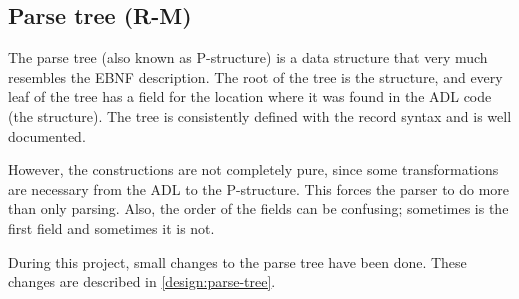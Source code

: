 
\subsection{Parse tree (R-M)}
\label{analysis:parse-tree}
The parse tree (also known as P-structure) is a data structure that very much resembles the EBNF description.
The root of the tree is the  structure, and every leaf of the tree has a field for the location where it was found in the ADL code (the  structure).
The tree is consistently defined with the record syntax and is well documented.

However, the constructions are not completely pure, since some transformations are necessary from the ADL to the P-structure.
This forces the parser to do more than only parsing.
Also, the order of the fields can be confusing; sometimes  is the first field and sometimes it is not.

During this project, small changes to the parse tree have been done.
These changes are described in \autoref{design:parse-tree}.
